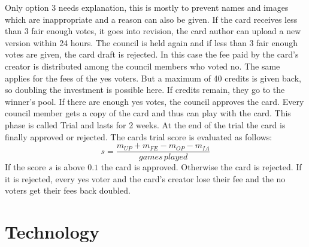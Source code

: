 \documentclass{article}
\begin{document}
%
Only option 3 needs explanation, this is mostly to prevent names and images which are inappropriate and a reason can also be given. If the card receives less than 3 fair enough votes, it goes into revision, the card author can upload a new version within 24 hours. The council is held again and if less than 3 fair enough votes are given, the card draft is rejected. In this case the fee paid by the card's creator is distributed among the council members who voted no. The same applies for the fees of the yes voters. But a maximum of 40 credits is given back, so doubling the investment is possible here. If credits remain, they go to the winner's pool. If there are enough yes votes, the council approves the card. Every council member gets a copy of the card and thus can play with the card. This phase is called Trial and lasts for 2 weeks. At the end of the trial the card is finally approved or rejected. The cards trial score is evaluated as follows:
%
\begin{equation}%
s = \frac{m_{UP} +  m_{FE} - m_{OP} - m_{IA}}{games \, played}
\end{equation}
%
If the score $s$ is above $0.1$ the card is approved. Otherwise the card is rejected. If it is rejected, every yes voter and the card's creator lose their fee and the no voters get their fees back doubled.
%
\section{Technology}
%
\end{document}
